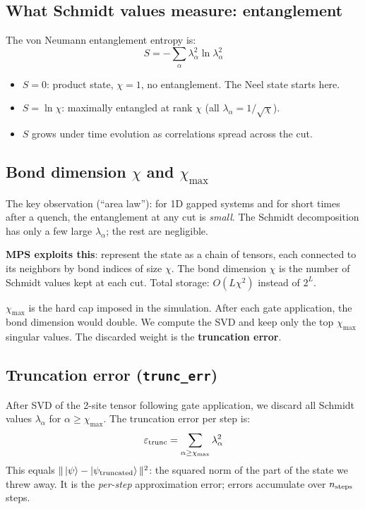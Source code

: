 \documentclass[11pt, a4paper]{article}
\begin{document}
\subsection{What Schmidt values measure: entanglement}

The von Neumann entanglement entropy is:
\begin{equation}
  S = -\sum_\alpha \lambda_\alpha^2 \ln \lambda_\alpha^2
\end{equation}
\begin{itemize}
  \item $S = 0$: product state, $\chi = 1$, no entanglement. The Neel state starts here.
  \item $S = \ln\chi$: maximally entangled at rank $\chi$ (all $\lambda_\alpha = 1/\sqrt{\chi}$).
  \item $S$ grows under time evolution as correlations spread across the cut.
\end{itemize}

\subsection{Bond dimension $\chi$ and $\chi_{\max}$}

The key observation (``area law''): for 1D gapped systems and for short times after a quench, the entanglement at any cut is \emph{small}. The Schmidt decomposition has only a few large $\lambda_\alpha$; the rest are negligible.

\textbf{MPS exploits this}: represent the state as a chain of tensors, each connected to its neighbors by bond indices of size $\chi$. The bond dimension $\chi$ is the number of Schmidt values kept at each cut. Total storage: $O(L \chi^2)$ instead of $2^L$.

\textbf{$\chi_{\max}$} is the hard cap imposed in the simulation. After each gate application, the bond dimension would double. We compute the SVD and keep only the top $\chi_{\max}$ singular values. The discarded weight is the \textbf{truncation error}.

\subsection{Truncation error (\texttt{trunc\_err})}

After SVD of the 2-site tensor following gate application, we discard all Schmidt values $\lambda_\alpha$ for $\alpha \geq \chi_{\max}$. The truncation error per step is:
\begin{equation}
  \varepsilon_{\rm trunc} = \sum_{\alpha \geq \chi_{\max}} \lambda_\alpha^2
  \label{eq:trunc}
\end{equation}
This equals $\|\ket{\psi} - \ket{\psi_{\rm truncated}}\|^2$: the squared norm of the part of the state we threw away. It is the \emph{per-step} approximation error; errors accumulate over $n_{\rm steps}$ steps.
\end{document}
